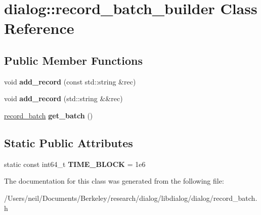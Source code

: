 \hypertarget{classdialog_1_1record__batch__builder}{}\section{dialog\+:\+:record\+\_\+batch\+\_\+builder Class Reference}
\label{classdialog_1_1record__batch__builder}
\subsection*{Public Member Functions}
\begin{DoxyCompactItemize}
\item 
\mbox{\label{classdialog_1_1record__batch__builder_a186db23833312d999558edb7ee8c2c0c}} 
void {\bfseries add\+\_\+record} (const std\+::string \&rec)
\item 
\mbox{\label{classdialog_1_1record__batch__builder_af17f5ac86d5183adda6ba1f77f8b0460}} 
void {\bfseries add\+\_\+record} (std\+::string \&\&rec)
\item 
\mbox{\label{classdialog_1_1record__batch__builder_a8c74ad06d5011ec0c27b759fc860b305}} 
\hyperlink{structdialog_1_1record__batch}{record\+\_\+batch} {\bfseries get\+\_\+batch} ()
\end{DoxyCompactItemize}
\subsection*{Static Public Attributes}
\begin{DoxyCompactItemize}
\item 
\mbox{\label{classdialog_1_1record__batch__builder_a147e4a0f71ba1253cb559abe2b70286d}} 
static const int64\+\_\+t {\bfseries T\+I\+M\+E\+\_\+\+B\+L\+O\+CK} = 1e6
\end{DoxyCompactItemize}


The documentation for this class was generated from the following file\+:\begin{DoxyCompactItemize}
\item 
/\+Users/neil/\+Documents/\+Berkeley/research/dialog/libdialog/dialog/record\+\_\+batch.\+h\end{DoxyCompactItemize}
